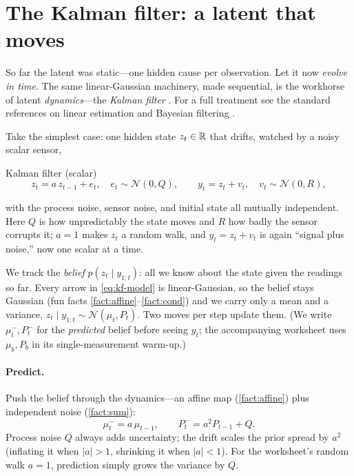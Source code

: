 \documentclass[11pt]{article}
\theoremstyle{plain}
\theoremstyle{definition}
\theoremstyle{remark}
\theoremstyle{definition}
\newcommand{\Normal}{\mathcal{N}}
\begin{document}
\section{The Kalman filter: a latent that moves}\label{sec:kalman}

So far the latent was static---one hidden cause per observation. Let it now
\emph{evolve in time}. The same linear-Gaussian machinery, made sequential, is
the workhorse of latent \emph{dynamics}---the \emph{Kalman filter}
\parencite{Kalman1960-wt}. For a full treatment see the standard
references on linear estimation and Bayesian filtering
\parencite{Kailath2000-le,Sarkka2013-bfs}.

Take the simplest case: one hidden state $z_t \in \mathbb{R}$ that drifts, watched by
a noisy scalar sensor,
\begin{genmodel}{Kalman filter (scalar)}
\begin{equation}\label{eq:kf-model}
  z_t = a\,z_{t-1} + e_t, \quad e_t \sim \Normal(0, Q),
  \qquad
  y_t = z_t + v_t, \quad v_t \sim \Normal(0, R),
\end{equation}
\end{genmodel}
with the process noise, sensor noise, and initial state all mutually independent.
Here $Q$ is how unpredictably the state moves and $R$ how badly the sensor
corrupts it; $a=1$ makes $z_t$ a random walk,
and $y_t = z_t + v_t$ is again ``signal plus noise,'' now one scalar at a time.

We track the \emph{belief} $p(z_t \mid y_{1:t})$: all we know about the state
given the readings so far. Every arrow in \eqref{eq:kf-model} is linear-Gaussian,
so the belief stays Gaussian (fun facts \ref{fact:affine}--\ref{fact:cond}) and we
carry only a mean and a variance, $z_t \mid y_{1:t} \sim \Normal(\mu_t, P_t)$. Two
moves per step update them. (We write $\mu_t^-, P_t^-$ for the \emph{predicted}
belief before seeing $y_t$; the accompanying worksheet uses
$\mu_b, P_b$ in its single-measurement warm-up.)

\paragraph{Predict.} Push the belief through the dynamics---an affine map
(\cref{fact:affine}) plus independent noise (\cref{fact:sum}):
\begin{equation}\label{eq:kf-predict}
  \mu_t^- = a\,\mu_{t-1}, \qquad P_t^- = a^2 P_{t-1} + Q.
\end{equation}
Process noise $Q$ always adds uncertainty; the drift scales the prior spread by
$a^2$ (inflating it when $|a|>1$, shrinking it when $|a|<1$). For the worksheet's
random walk $a=1$, prediction simply grows the variance by $Q$.
\end{document}
